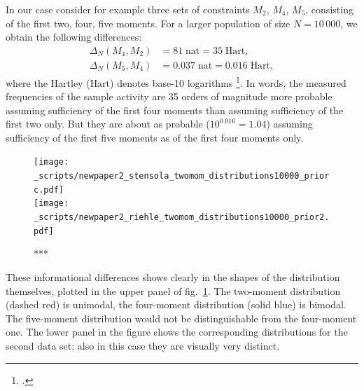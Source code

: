 \documentclass[\ifafour a4paper,12pt,\else a5paper,10pt,\fi%
onecolumn,oneside,article,%
british%
]{memoir}
\theoremstyle{remark}
\theoremstyle{innote}
\newcommand*{\citep}{\footcites}
\renewcommand*{\|}{\nonscript\,\vert\nonscript\;\mathopen{}}
\newcommand*{\sect}{\S}%
\newcommand*{\fig}{fig.}%
\newcommand*{\ydi}{\varDelta}
\newcommand*{\nat}{\textrm{nat}}
\newcommand*{\hart}{\textrm{Hart}}
\begin{document}
%
%
% 
%
%

\bigskip

In our case consider for example three sets of constraints $M_{2}$,
$M_{4}$, $M_{5}$, consisting of the first two, four, five moments. For a
larger population of size $N=10\,000$, we obtain the following differences:
\begin{equation}
  \label{eq:diff_suff_N}
  \begin{split}
  \ydi_{N}(M_{4},M_{2}) &= 81\;\nat = 35\;\hart,
\\    \ydi_{N}(M_{5},M_{4}) &= 0.037\;\nat = 0.016\;\hart,
  \end{split}
\end{equation}
where the Hartley ($\hart$) denotes base-10 logarithms
\citep[\sect~C.4]{iso2009}[it was called \enquote{ban} and used by Turing
and Good in their code-breaking work at Bletchley
Park:][]{good1985,good1950,good1969}[\sect~4.2]{jaynes1994_r2003}. In
words, the measured frequencies of the sample activity are 35 orders of
magnitude more probable assuming sufficiency of the first four moments than
assuming sufficiency of the first two only. But they are about as probable
($10^{0.016} = 1.04$) assuming sufficiency of the first five moments as of
the first four moments only.

\begin{figure}[!p]
\centering
\texttt{[image: \_scripts/newpaper2\_stensola\_twomom\_distributions10000\_priorc.pdf]}%
\\[3em]%
\texttt{[image: \_scripts/newpaper2\_riehle\_twomom\_distributions10000\_prior2.pdf]}%
\caption{***}
\label{fig:plots_2_4mom}
\end{figure}
These informational differences shows clearly in the shapes of the
distribution themselves, plotted in the upper panel of
\fig~\ref{fig:plots_2_4mom}. The two-moment distribution
(\textcolor{myred}{dashed red}) is unimodal, the four-moment distribution
(\textcolor{myblue}{solid blue}) is bimodal. The five-moment distribution
would not be distinguishable from the four-moment one. The lower panel in
the figure shows the corresponding distributions for the second data set;
also in this case they are visually very distinct.
\end{document}
